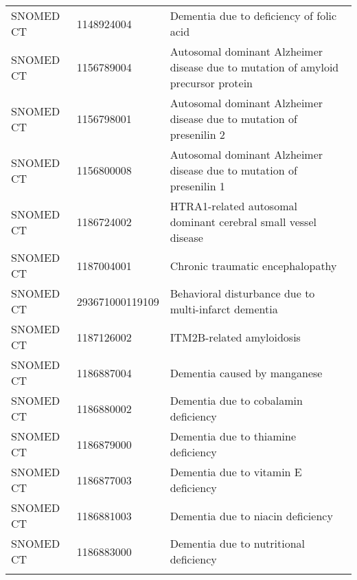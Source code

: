 \begin{longtable}{p{}p{}p{}}
  SNOMED CT & 1148924004 & Dementia due to deficiency of folic acid \\ 
  SNOMED CT & 1156789004 & Autosomal dominant Alzheimer disease due to mutation of amyloid precursor protein \\ 
  SNOMED CT & 1156798001 & Autosomal dominant Alzheimer disease due to mutation of presenilin 2 \\ 
  SNOMED CT & 1156800008 & Autosomal dominant Alzheimer disease due to mutation of presenilin 1 \\ 
  SNOMED CT & 1186724002 & HTRA1-related autosomal dominant cerebral small vessel disease \\ 
  SNOMED CT & 1187004001 & Chronic traumatic encephalopathy \\ 
  SNOMED CT & 293671000119109 & Behavioral disturbance due to multi-infarct dementia \\ 
  SNOMED CT & 1187126002 & ITM2B-related amyloidosis \\ 
  SNOMED CT & 1186887004 & Dementia caused by manganese \\ 
  SNOMED CT & 1186880002 & Dementia due to cobalamin deficiency \\ 
  SNOMED CT & 1186879000 & Dementia due to thiamine deficiency \\ 
  SNOMED CT & 1186877003 & Dementia due to vitamin E deficiency \\ 
  SNOMED CT & 1186881003 & Dementia due to niacin deficiency \\ 
  SNOMED CT & 1186883000 & Dementia due to nutritional deficiency \\ 
  \hline
\label{tab:codes_dementia}
\end{longtable}
